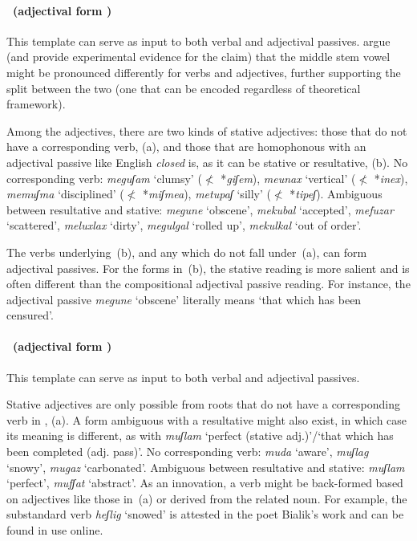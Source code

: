 \paragraph*{\tpie~(adjectival form \mpua)}
This template can serve as input to both verbal and adjectival passives. \cite{lakscohen16} argue (and provide experimental evidence for the claim) that the middle stem vowel might be pronounced differently for verbs and adjectives, further supporting the split between the two (one that can be encoded regardless of theoretical framework).

Among the adjectives, there are two kinds of stative adjectives: those that do not have a corresponding verb, (\nextx a), and those that are homophonous with an adjectival passive like English \emph{closed} is, as it can be stative or resultative, (\nextx b).
\pex
  \a No corresponding verb: \emph{meguʃam} `clumsy' ($\nless$ *\emph{giʃem}), \emph{meunax} `vertical' ($\nless$ *\emph{inex}), \emph{memuʃma} `disciplined' ($\nless$ *\emph{miʃmea}), \emph{metupaʃ} `silly' ($\nless$ *\emph{tipeʃ}).
  \a Ambiguous between resultative and stative: \emph{megune} `obscene', \emph{mekubal} `accepted', \emph{mefuzar} `scattered', \emph{meluxlax} `dirty', \emph{megulgal} `rolled up', \emph{mekulkal} `out of order'. %
\xe

The verbs underlying~(\lastx b), and any which do not fall under~(\lastx a), can form adjectival passives. For the forms in~(\lastx b), the stative reading is more salient and is often different than the compositional adjectival passive reading. For instance, the adjectival passive \emph{megune} `obscene' literally means `that which has been censured'.

\paragraph*{\thif~(adjectival form \mhuf)}
This template can serve as input to both verbal and adjectival passives.

Stative adjectives are only possible from roots that do not have a corresponding verb in \thif, (\nextx a). A form ambiguous with a resultative might also exist, in which case its meaning is different, as with \emph{muʃlam} `perfect (stative adj.)'/`that which has been completed (adj. pass)'.
\pex
  \a No corresponding verb: \emph{muda} `aware', \emph{muʃlag} `snowy', \emph{mugaz} `carbonated'.
  \a Ambiguous between resultative and stative: \emph{muʃlam} `perfect', \emph{mufʃat} `abstract'.
\xe
As an innovation, a verb might be back-formed based on adjectives like those in~(\lastx a) or derived from the related noun. For example, the substandard verb \emph{heʃlig} `snowed' is attested in the poet Bialik's work and can be found in use online.

